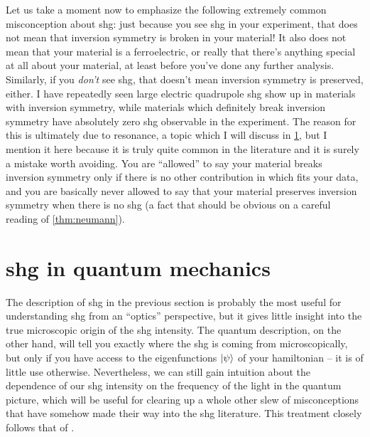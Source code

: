 Let us take a moment now to emphasize the following extremely common misconception about \gls{shg}: just because you see \gls{shg} in your experiment, that does not mean that inversion symmetry is broken in your material!
It also does not mean that your material is a ferroelectric, or really that there's anything special at all about your material, at least before you've done any further analysis.
Similarly, if you \emph{don't} see \gls{shg}, that doesn't mean inversion symmetry is preserved, either.
I have repeatedly seen large electric quadrupole \gls{shg} show up in materials with inversion symmetry, while materials which definitely break inversion symmetry have absolutely zero \gls{shg} observable in the experiment.
The reason for this is ultimately due to resonance, a topic which I will discuss in \cref{sec:resonance}, but I mention it here because it is truly quite common in the literature and it is surely a mistake worth avoiding.
You are ``allowed'' to say your material breaks inversion symmetry only if there is no other contribution in  which fits your data, and you are basically never allowed to say that your material preserves inversion symmetry when there is no \gls{shg} (a fact that should be obvious on a careful reading of \cref{thm:neumann}).

\section{\Gls{shg} in quantum mechanics}\label{sec:resonance}

The description of \gls{shg} in the previous section is probably the most useful for understanding \gls{shg} from an ``optics'' perspective, but it gives little insight into the true microscopic origin of the \gls{shg} intensity.
The quantum description, on the other hand, will tell you exactly where the \gls{shg} is coming from microscopically, but only if you have access to the eigenfunctions $\ket{\psi}$ of your hamiltonian -- it is of little use otherwise.
Nevertheless, we can still gain intuition about the dependence of our \gls{shg} intensity on the frequency of the light in the quantum picture, which will be useful for clearing up a whole other slew of misconceptions that have somehow made their way into the \gls{shg} literature.
This treatment closely follows that of .

